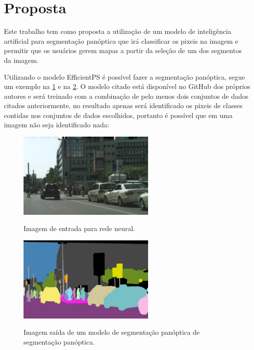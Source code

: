 \section{Proposta}

Este trabalho tem como proposta a utilização de um modelo de inteligência artificial para segmentação panóptica que irá classificar os pixeis na imagem e permitir que os usuários gerem mapas a partir da seleção de um dos segmentos da imagem.

Utilizando o modelo EfficientPS é possível fazer a segmentação panóptica, segue um exemplo na \cref{fig:segmantations_1} e na \cref{fig:segmantations_2}. O modelo citado está disponível no GitHub dos próprios autores  e será treinado com a combinação de pelo menos dois conjuntos de dados citados anteriormente, no resultado apenas será identificado os pixeis de classes contidas nos conjuntos de dados escolhidos, portanto é possível que em uma imagem não seja identificado nada:

\begin{figure}[!ht]
	\centering
    \caption{Imagem de entrada para rede neural.}
	\includegraphics[width=0.6\textwidth]{figures/segmantations_1.png}
	\label{fig:segmantations_1}
\end{figure}

\begin{figure}[!ht]
	\centering
    \caption{Imagem saída de um modelo de segmentação panóptica de segmentação panóptica.}
	\includegraphics[width=0.6\textwidth]{figures/segmantations_2.png}
	\label{fig:segmantations_2}
\end{figure}

